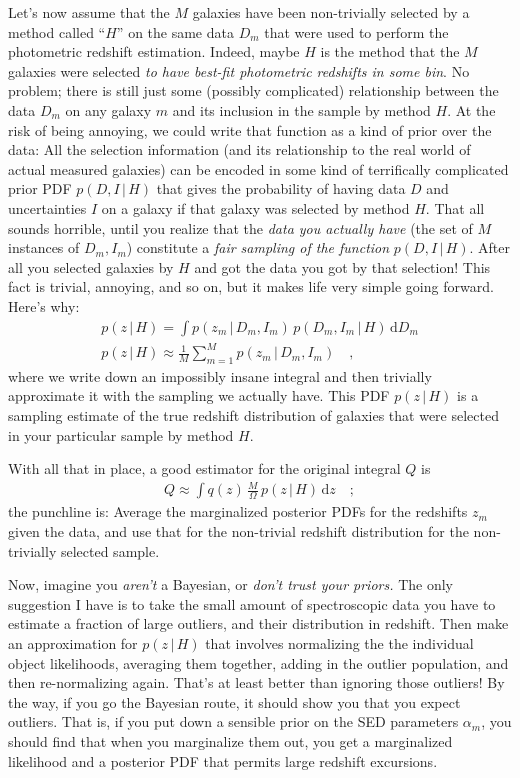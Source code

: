 \documentclass[12pt]{article}
\newcommand{\given}{\,|\,}
\newcommand{\dd}{\mathrm d}
\begin{document}
Let's now assume that the $M$ galaxies have been non-trivially
selected by a method called ``$H$'' on the same data $D_m$ that were
used to perform the photometric redshift estimation.  Indeed, maybe
$H$ is the method that the $M$ galaxies were selected \emph{to have
  best-fit photometric redshifts in some bin}.  No problem; there is
still just some (possibly complicated) relationship between the data
$D_m$ on any galaxy $m$ and its inclusion in the sample by method $H$.
At the risk of being annoying, we could write that function as a kind
of prior over the data: All the selection information (and its
relationship to the real world of actual measured galaxies) can be encoded in
some kind of terrifically complicated prior PDF $p(D, I \given H)$
that gives the probability of having data $D$ and uncertainties $I$ on
a galaxy if that galaxy was selected by method $H$.  That all sounds
horrible, until you realize that the \emph{data you actually have}
(the set of $M$ instances of $D_m, I_m$) constitute a \emph{fair
  sampling of the function} $p(D, I \given H)$.  After all you
selected galaxies by $H$ and got the data you got by that selection!
This fact is trivial, annoying, and so on, but it makes life very
simple going forward.  Here's why:
\begin{eqnarray}\displaystyle
p(z \given H) = \int p(z_m \given D_m, I_m)\,p(D_m, I_m \given H)\,\dd D_m
\\
p(z \given H) \approx \frac{1}{M} \sum_{m=1}^M p(z_m \given D_m, I_m)
\quad ,
\end{eqnarray}
where we write down an impossibly insane integral and then trivially
approximate it with the sampling we actually have.  This PDF $p(z
\given H)$ is a sampling estimate of the true redshift distribution of
galaxies that were selected in your particular sample by method $H$.

With all that in place, a good estimator for the original integral $Q$ is
\begin{eqnarray}\displaystyle
Q \approx \int q(z)\,\frac{M}{\Omega}\,p(z \given H)\,\dd z
\quad ;
\end{eqnarray}
the punchline is: Average the marginalized posterior PDFs for the
redshifts $z_m$ given the data, and use that for the non-trivial
redshift distribution for the non-trivially selected sample.

Now, imagine you \emph{aren't} a Bayesian, or \emph{don't trust your
  priors.}  The only suggestion I have is to take the small amount of
spectroscopic data you have to estimate a fraction of large outliers,
and their distribution in redshift.  Then make an approximation for
$p(z \given H)$ that involves normalizing the the individual object
likelihoods, averaging them together, adding in the outlier
population, and then re-normalizing again.  That's at least better
than ignoring those outliers!  By the way, if you go the Bayesian
route, it should show you that you expect outliers.  That is, if you
put down a sensible prior on the SED parameters $\alpha_m$, you should
find that when you marginalize them out, you get a marginalized
likelihood and a posterior PDF that permits large redshift excursions.
\end{document}
